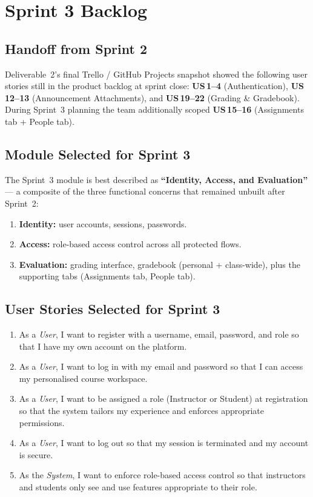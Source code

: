 \documentclass[12pt, a4paper]{article}
\begin{document}
\section{Sprint 3 Backlog}

\subsection{Handoff from Sprint 2}

Deliverable~2's final Trello / GitHub Projects snapshot showed the following
user stories still in the product backlog at sprint close: \textbf{US\,1–4}
(Authentication), \textbf{US\,12–13} (Announcement Attachments), and
\textbf{US\,19–22} (Grading \& Gradebook). During Sprint~3 planning the team
additionally scoped \textbf{US\,15–16} (Assignments tab + People tab).

\subsection{Module Selected for Sprint 3}

The Sprint~3 module is best described as \textbf{``Identity, Access, and
Evaluation''} --- a composite of the three functional concerns that remained
unbuilt after Sprint~2:
\begin{enumerate}
  \item \textbf{Identity:} user accounts, sessions, passwords.
  \item \textbf{Access:} role-based access control across all protected flows.
  \item \textbf{Evaluation:} grading interface, gradebook (personal + class-wide),
        plus the supporting tabs (Assignments tab, People tab).
\end{enumerate}

\subsection{User Stories Selected for Sprint 3}

\begin{enumerate}[label=\textbf{US\,\arabic*}]
  \setcounter{enumi}{0}
  \item As a \emph{User}, I want to register with a username, email, password, and role so that I have my own account on the platform.
  \item As a \emph{User}, I want to log in with my email and password so that I can access my personalised course workspace.
  \item As a \emph{User}, I want to be assigned a role (Instructor or Student) at registration so that the system tailors my experience and enforces appropriate permissions.
  \item As a \emph{User}, I want to log out so that my session is terminated and my account is secure.
  \item As the \emph{System}, I want to enforce role-based access control so that instructors and students only see and use features appropriate to their role.
\end{enumerate}
\end{document}
